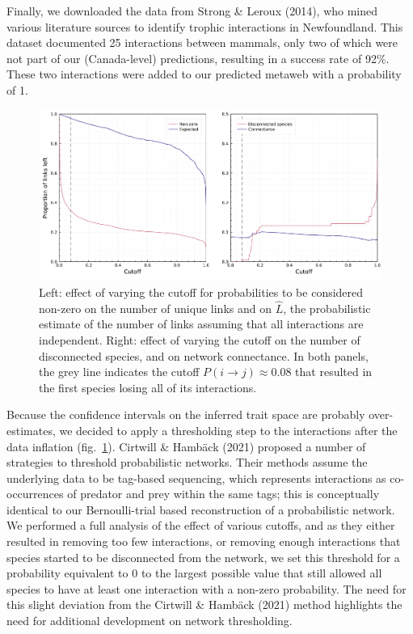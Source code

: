 \documentclass[11pt]{article}
\makeatletter
\def\maxwidth{\ifdim\Gin@nat@width>\linewidth\linewidth
\else\Gin@nat@width\fi}
\let\Oldincludegraphics\includegraphics
\renewcommand{\includegraphics}[1]{\Oldincludegraphics[width=\maxwidth]{#1}}
\makeatother
\begin{document}
Finally, we downloaded the data from Strong \& Leroux (2014), who mined
various literature sources to identify trophic interactions in
Newfoundland. This dataset documented 25 interactions between mammals,
only two of which were not part of our (Canada-level) predictions,
resulting in a success rate of 92\%. These two interactions were added
to our predicted metaweb with a probability of 1.

\begin{figure}
\hypertarget{fig:thresholds}{%
\centering
\includegraphics{figures/figure-cutoffs.png}
\caption{Left: effect of varying the cutoff for probabilities to be
considered non-zero on the number of unique links and on \(\hat{L}\),
the probabilistic estimate of the number of links assuming that all
interactions are independent. Right: effect of varying the cutoff on the
number of disconnected species, and on network connectance. In both
panels, the grey line indicates the cutoff
\(P(i\rightarrow j) \approx 0.08\) that resulted in the first species
losing all of its interactions.}\label{fig:thresholds}
}
\end{figure}

Because the confidence intervals on the inferred trait space are
probably over-estimates, we decided to apply a thresholding step to the
interactions after the data inflation (fig.~\ref{fig:thresholds}).
Cirtwill \& Hambäck (2021) proposed a number of strategies to threshold
probabilistic networks. Their methods assume the underlying data to be
tag-based sequencing, which represents interactions as co-occurrences of
predator and prey within the same tags; this is conceptually identical
to our Bernoulli-trial based reconstruction of a probabilistic network.
We performed a full analysis of the effect of various cutoffs, and as
they either resulted in removing too few interactions, or removing
enough interactions that species started to be disconnected from the
network, we set this threshold for a probability equivalent to 0 to the
largest possible value that still allowed all species to have at least
one interaction with a non-zero probability. The need for this slight
deviation from the Cirtwill \& Hambäck (2021) method highlights the need
for additional development on network thresholding.
\end{document}

